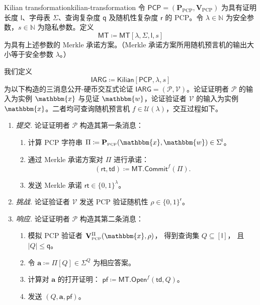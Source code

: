 \documentclass[american,singlepageview]{snargs-book-zh}
\newcommand{\Bits}{\{0,1\}}
\newcommand{\DefineEqual}{\coloneqq}
\renewcommand{\vec}[1]{\bm{#1}}
\newcommand{\Cardinality}[1]{\left|{#1}\right|}
\newcommand{\Naturals}{\mathbb{N}}
\newcommand{\Instance}{\mathbbm{x}}
\newcommand{\Witness}{\mathbbm{w}}
\newcommand{\ProtoProver}{P}
\newcommand{\ProtoVerifier}{V}
\newcommand{\ProtoAlphabet}{\Sigma}
\newcommand{\ProtoProofLength}{\mathsf{l}}
\newcommand{\ProtoQueryComplexity}{\mathsf{q}}
\newcommand{\ProtoRandomnessComplexity}{\mathsf{r}}
\newcommand{\PCPSymbol}{\mathsf{PCP}}
\newcommand{\PCPSubscript}{\scriptscriptstyle\mathrm{PCP}}
\newcommand{\PCPFormat}[1]{\mathbf{#1}}
\newcommand{\PCPProver}{\PCPFormat{\ProtoProver}_{\PCPSubscript}}
\newcommand{\PCPVerifier}{\PCPFormat{\ProtoVerifier}_{\PCPSubscript}}
\newcommand{\PCPSystem}{(\PCPProver,\PCPVerifier)}
\newcommand{\PCPString}{\Pi}
\newcommand{\PCPEntry}{a}
\newcommand{\PCPEntries}{\vec{\PCPEntry}}
\newcommand{\PCPQuerySet}{Q}
\newcommand{\PCPVerifierRandomMessage}{\rho}
\newcommand{\PCPAlphabet}{\ProtoAlphabet}
\newcommand{\PCPProofLength}{\ProtoProofLength}
\newcommand{\PCPRandomnessComplexity}{\ProtoRandomnessComplexity}
\newcommand{\PCPQueryComplexity}{\ProtoQueryComplexity}
\newcommand{\ARGFormat}[1]{\mathcal{#1}}
\newcommand{\ARGProver}{\ARGFormat{\ProtoProver}}
\newcommand{\ARGVerifier}{\ARGFormat{\ProtoVerifier}}
\newcommand{\ARGSystem}{(\ARGProver,\ARGVerifier)}
\newcommand{\IARGSymbol}{\mathsf{IARG}}
\newcommand{\ROFunction}{f}
\newcommand{\RODistribution}[1]{\mathcal{U}(#1)}
\newcommand{\SecurityParameter}{\lambda}
\newcommand{\PrivacyParameter}{s}
\newcommand{\MTSymbol}{\mathsf{MT}}
\newcommand{\MTConstructor}[4]{\MTSymbol[#1,#2,#3,#4]}
\newcommand{\MTCommit}{\MTSymbol.\mathsf{Commit}}
\newcommand{\MTOpen}{\MTSymbol.\mathsf{Open}}
\newcommand{\MTCommitment}{\mathsf{rt}}
\newcommand{\MTTrapdoor}{\mathsf{td}}
\newcommand{\MTProof}{\mathsf{pf}}
\newcommand{\FormatTransName}[1]{\bm{\mathsf{#1}}}
\newcommand{\KilianSymbol}{\FormatTransName{Kilian}}
\newcommand{\FormatTransInputs}[3]{[#1,#2,#3]}
\newcommand{\KilianTransformation}[3]{\KilianSymbol\FormatTransInputs{#1}{#2}{#3}}
\newcommand{\KilianText}{Kilian transformation\xspace}
\begin{document}
\begin{ImportantConstruction}{\KilianText}{kilian-transformation}
令 $\PCPSymbol=\PCPSystem$ 为具有证明长度 $\PCPProofLength$、字母表 $\PCPAlphabet$、查询复杂度 $\PCPQueryComplexity$ 及随机性复杂度 $\PCPRandomnessComplexity$ 的 PCP。令 $\SecurityParameter\in\Naturals$ 为安全参数，$\PrivacyParameter\in\Naturals$ 为隐私参数。定义
\[
  \MTSymbol\DefineEqual\MTConstructor{\SecurityParameter}{\PCPAlphabet}{\PCPProofLength}{\PrivacyParameter}
\]
为具有上述参数的 Merkle 承诺方案。（Merkle 承诺方案所用随机预言机的输出大小等于安全参数 $\SecurityParameter$。）

我们定义
\[
  \IARGSymbol\DefineEqual\KilianTransformation{\PCPSymbol}{\SecurityParameter}{\PrivacyParameter}
\]
为以下构造的三消息公开-硬币交互式论证 $\IARGSymbol=\ARGSystem$。论证证明者 $\ARGProver$ 的输入为实例 $\Instance$ 与见证 $\Witness$，论证验证者 $\ARGVerifier$ 的输入为实例 $\Instance$。二者均可查询随机预言机 $\ROFunction\in\RODistribution{\SecurityParameter}$，交互过程如下。
\begin{enumerate}

\item \emph{提交.}
  论证证明者 $\ARGProver$ 构造其第一条消息：
  \begin{enumerate}[nolistsep]
    \item 计算 PCP 字符串
      \(\PCPString\DefineEqual\PCPProver(\Instance,\Witness)\in\PCPAlphabet^{\PCPProofLength}\)。
    \item 通过 Merkle 承诺方案对 $\PCPString$ 进行承诺：
      \[
        (\MTCommitment,\MTTrapdoor)
        \DefineEqual
        \MTCommit^{\ROFunction}(\PCPString).
      \]
    \item 发送 Merkle 承诺 $\MTCommitment\in\Bits^{\SecurityParameter}$。
  \end{enumerate}

\item \emph{挑战.}
  论证验证者 $\ARGVerifier$ 发送 PCP 验证随机性
  \(\PCPVerifierRandomMessage\in\Bits^{\PCPRandomnessComplexity}\)。

\item \emph{响应.}
  论证证明者 $\ARGProver$ 构造其第二条消息：
  \begin{enumerate}[nolistsep]
    \item 模拟 PCP 验证者
      \(\PCPVerifier^{\PCPString}(\Instance,\PCPVerifierRandomMessage)\)，
      得到查询集 \(\PCPQuerySet\subseteq[\PCPProofLength]\)，
      且 \(\Cardinality{\PCPQuerySet}\le\PCPQueryComplexity\)。
    \item 令
      \(\PCPEntries\DefineEqual\PCPString[\PCPQuerySet]\in\PCPAlphabet^{\PCPQuerySet}\)
      为相应答案。
    \item 计算对 \(\PCPEntries\) 的打开证明：
      \(\MTProof\DefineEqual\MTOpen^{\ROFunction}(\MTTrapdoor,\PCPQuerySet)\)。
    \item 发送
      \((\PCPQuerySet,\PCPEntries,\MTProof)\)。
  \end{enumerate}


\end{enumerate}
\end{ImportantConstruction}
\end{document}
